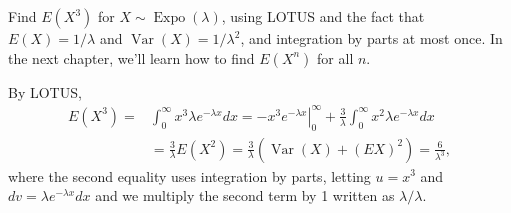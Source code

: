 

\setcounter{theorem}{47}
\begin{exercise}[BH.5.48] Find $E\left(X^3\right)$ for $X \sim \operatorname{Expo}(\lambda)$, using LOTUS and the fact that $E(X)=1 / \lambda$ and $\operatorname{Var}(X)=1 / \lambda^2$, and integration by parts at most once. In the next chapter, we'll learn how to find $E\left(X^n\right)$ for all $n$.
\begin{solution}
    By LOTUS,
    $$
    \begin{aligned}
        E\left(X^3\right)=& \int_0^{\infty} x^3 \lambda e^{-\lambda x} d x=-\left.x^3 e^{-\lambda x}\right|_0 ^{\infty}+\frac{3}{\lambda} \int_0^{\infty} x^2 \lambda e^{-\lambda x} d x \\
        &=\frac{3}{\lambda} E\left(X^2\right)=\frac{3}{\lambda}\left(\operatorname{Var}(X)+(E X)^2\right)=\frac{6}{\lambda^3},
    \end{aligned}
    $$
    where the second equality uses integration by parts, letting $u=x^3$ and $d v=\lambda e^{-\lambda x} d x$ and we multiply the second term by 1 written as $\lambda / \lambda$.
\end{solution}
\end{exercise}


